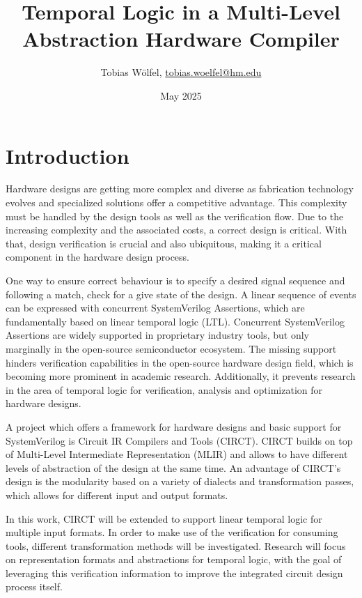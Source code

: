 \documentclass[11pt,DIV=16,parskip=half]{scrartcl}
\title{Temporal Logic in a Multi-Level Abstraction Hardware Compiler}
\author{Tobias Wölfel, \href{mailto:tobias.woelfel@hm.edu}{tobias.woelfel@hm.edu}}
\date{May 2025}
\begin{document}
\maketitle

\section{Introduction}

Hardware designs are getting more complex and diverse as fabrication technology
evolves and specialized solutions offer a competitive advantage.
This complexity must be handled by the design tools as well as the verification
flow.
Due to the increasing complexity and the associated costs, a correct design is
critical.
With that, design verification is crucial and also ubiquitous, making it a
critical component in the hardware design process.

One way to ensure correct behaviour is to specify a desired signal sequence and
following a match, check for a give state of the design.
A linear sequence of events can be expressed with concurrent SystemVerilog
Assertions, which are fundamentally based on linear temporal logic (LTL).
Concurrent SystemVerilog Assertions are widely supported in proprietary
industry tools, but only marginally in the open-source semiconductor ecosystem.
The missing support hinders verification capabilities in the open-source
hardware design field, which is becoming more prominent in academic research.
Additionally, it prevents research in the area of temporal logic for
verification, analysis and optimization for hardware designs.

A project which offers a framework for hardware designs and basic support for
SystemVerilog is Circuit IR Compilers and Tools (CIRCT).
CIRCT builds on top of Multi-Level Intermediate Representation (MLIR) and
allows to have different levels of abstraction of the design at the same time.
An advantage of CIRCT's design is the modularity based on a variety of dialects
and transformation passes, which allows for different input and output formats.

In this work, CIRCT will be extended to support linear temporal logic for
multiple input formats.
In order to make use of the verification for consuming tools, different
transformation methods will be investigated.
Research will focus on representation formats and abstractions for temporal
logic, with the goal of leveraging this verification information to improve the
integrated circuit design process itself.
\end{document}
